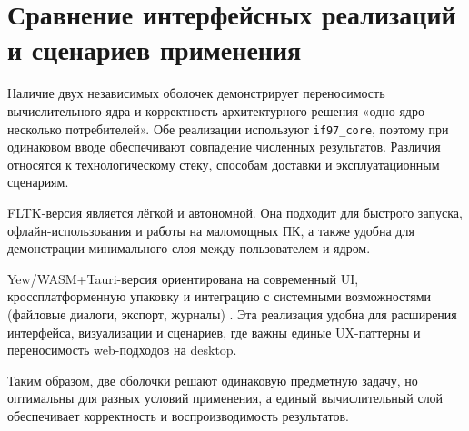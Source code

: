 \section{Сравнение интерфейсных реализаций и сценариев применения}

Наличие двух независимых оболочек демонстрирует переносимость вычислительного ядра и корректность архитектурного решения «одно ядро --- несколько потребителей».  
Обе реализации используют \texttt{if97\_core}, поэтому при одинаковом вводе обеспечивают совпадение численных результатов.  
Различия относятся к технологическому стеку, способам доставки и эксплуатационным сценариям.  

FLTK-версия является лёгкой и автономной.  
Она подходит для быстрого запуска, офлайн-использования и работы на маломощных ПК,
а также удобна для демонстрации минимального слоя между пользователем и ядром.  

Yew/WASM+Tauri-версия ориентирована на современный UI,
кроссплатформенную упаковку и интеграцию с системными возможностями (файловые диалоги, экспорт, журналы) \cite{tauri_docs}.  
Эта реализация удобна для расширения интерфейса, визуализации и сценариев,
где важны единые UX-паттерны и переносимость web-подходов на desktop.  

Таким образом, две оболочки решают одинаковую предметную задачу,
но оптимальны для разных условий применения,
а единый вычислительный слой обеспечивает корректность и воспроизводимость результатов.  
